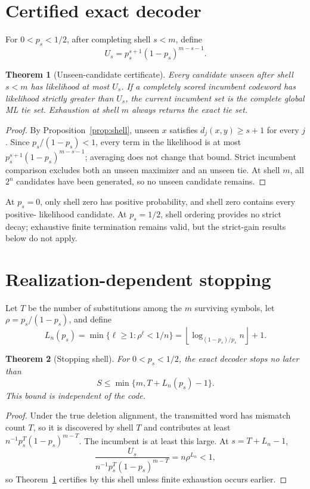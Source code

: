 \documentclass[11pt]{article}
\newtheorem{theorem}{Theorem}
\theoremstyle{remark}\newtheorem{remark}[theorem]{Remark}
\begin{document}
\section{Certified exact decoder}
For $0<p_s<1/2$, after completing shell $s<m$, define
\[
 U_s=p_s^{s+1}(1-p_s)^{m-s-1}.
\]
\begin{theorem}[Unseen-candidate certificate]\label{thm:cert}
Every candidate unseen after shell $s<m$ has likelihood at most $U_s$. If a completely scored
incumbent codeword has likelihood strictly greater than $U_s$, the current incumbent set is the
complete global ML tie set. Exhaustion at shell $m$ always returns the exact tie set.
\end{theorem}
\begin{proof}
By Proposition~\ref{prop:shell}, unseen $x$ satisfies $d_j(x,y)\ge s+1$ for every $j$. Since
$p_s/(1-p_s)<1$, every term in the likelihood is at most
$p_s^{s+1}(1-p_s)^{m-s-1}$; averaging does not change that bound. Strict incumbent comparison
excludes both an unseen maximizer and an unseen tie. At shell $m$, all $2^n$ candidates have been
generated, so no unseen candidate remains.
\end{proof}
At $p_s=0$, only shell zero has positive probability, and shell zero contains every positive-
likelihood candidate. At $p_s=1/2$, shell ordering provides no strict decay; exhaustive finite
termination remains valid, but the strict-gain results below do not apply.

\section{Realization-dependent stopping}
Let $T$ be the number of substitutions among the $m$ surviving symbols, let
$\rho=p_s/(1-p_s)$, and define
\[
 L_n(p_s)=\min\{\ell\ge1:\rho^\ell<1/n\}
 =\left\lfloor\log_{(1-p_s)/p_s}n\right\rfloor+1.
\]
\begin{theorem}[Stopping shell]\label{thm:stop}
For $0<p_s<1/2$, the exact decoder stops no later than
\[
 S\le\min\{m,T+L_n(p_s)-1\}.
\]
This bound is independent of the code.
\end{theorem}
\begin{proof}
Under the true deletion alignment, the transmitted word has mismatch count $T$, so it is discovered
by shell $T$ and contributes at least $n^{-1}p_s^T(1-p_s)^{m-T}$. The incumbent is at least this
large. At $s=T+L_n-1$,
\[
 \frac{U_s}{n^{-1}p_s^T(1-p_s)^{m-T}}=n\rho^{L_n}<1,
\]
so Theorem~\ref{thm:cert} certifies by this shell unless finite exhaustion occurs earlier.
\end{proof}
\end{document}
